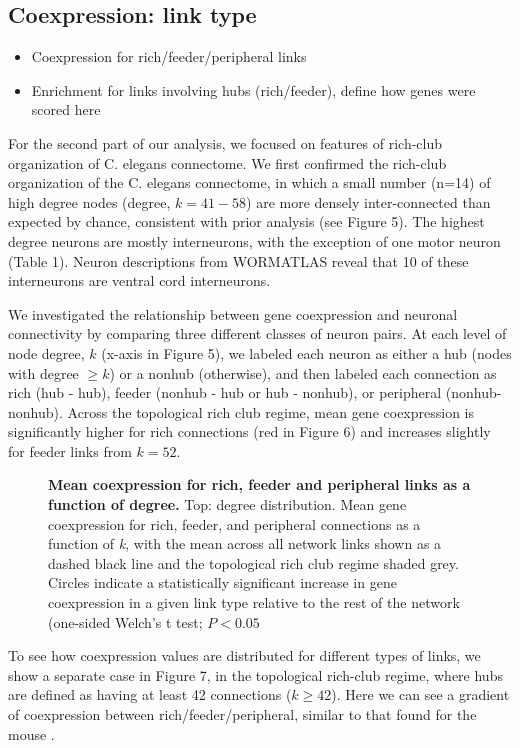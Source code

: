 \documentclass[10pt,letterpaper]{article}
\begin{document}
\subsection*{Coexpression: link type}
\begin{itemize}
    \item{Coexpression for rich/feeder/peripheral links}
    \item{Enrichment for links involving hubs (rich/feeder), define how genes were scored here}
\end{itemize} 

For the second part of our analysis, we focused on features of rich-club organization of C. elegans connectome. We first confirmed the rich-club organization of the C. elegans connectome, in which a small number (n=14) of high degree nodes (degree, $k = 41-58$) are more densely inter-connected than expected by chance, consistent with prior analysis \cite{Towlson2013} (see Figure 5).
The highest degree neurons are mostly interneurons, with the exception of one motor neuron (Table 1).
Neuron descriptions from WORMATLAS reveal that 10 of these interneurons are ventral cord interneurons.

We investigated the relationship between gene coexpression and neuronal connectivity by comparing three different classes of neuron pairs.
At each level of node degree, $k$ (x-axis in Figure 5), we labeled each neuron as either a hub (nodes with degree $\geq k$) or a nonhub (otherwise), and then labeled each connection as rich (hub - hub), feeder (nonhub - hub or hub - nonhub), or peripheral (nonhub- nonhub). Across the topological rich club regime, mean gene coexpression is significantly higher for rich connections (red in Figure 6) and increases slightly for feeder links from $k=52$.

 \begin{figure}[!h]
 \caption{{\bf Mean coexpression for rich, feeder and peripheral links as a function of degree.}
Top: degree distribution. Mean gene coexpression for rich, feeder, and peripheral connections as a function of \textit{k}, with the mean across all network links shown as a dashed black line and the topological rich club regime shaded grey. Circles indicate a statistically significant increase in gene coexpression in a given link type relative to the rest of the network (one-sided Welch’s t test; $P < 0.05$}
 \label{RCdegree}
 \end{figure}

To see how coexpression values are distributed for different types of links, we show a separate case in Figure 7, in the topological rich-club regime, where hubs are defined as having at least 42 connections ($k \geq 42$).
Here we can see a gradient of coexpression between rich/feeder/peripheral, similar to that found for the mouse \cite{Fulcher2015}.
\end{document}
